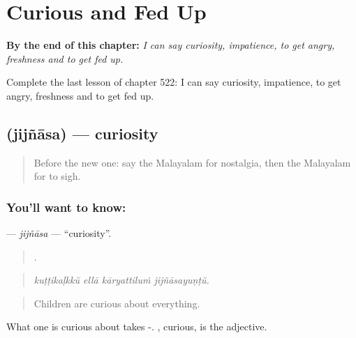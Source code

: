 
\chapter{Curious and Fed Up}
\label{ch:ml-curious-and-fed-up}

\begin{chapteropening}
\textbf{By the end of this chapter:} \emph{I can say curiosity, impatience, to get angry, freshness and to get fed up.}

Complete the last lesson of chapter 522: I can say curiosity, impatience, to get angry, freshness and to get fed up.
\end{chapteropening}

\section[\texorpdfstring{\ml{ജിജ്ഞാസ} (jijñāsa)}{ജിജ്ഞാസ (jijñāsa)}]{ (jijñāsa) — curiosity}

\label{lesson:ML-C522-jijnasa}



\begin{quote}
Before the new one: say the Malayalam for nostalgia, then the Malayalam for to sigh.
\end{quote}

\subsection*{You'll want to know: }
\textbf{} — \emph{jijñāsa} — \textquotedblleft{}curiosity\textquotedblright{}.

\begin{quote}
   .
\end{quote}

\begin{quote}
\emph{kuṭṭikaḷkkŭ ellā kāryattiluṁ jijñāsayuṇṭŭ.}
\end{quote}

\begin{quote}
Children are curious about everything.
\end{quote}

What one is curious about takes -. , curious, is the adjective.

